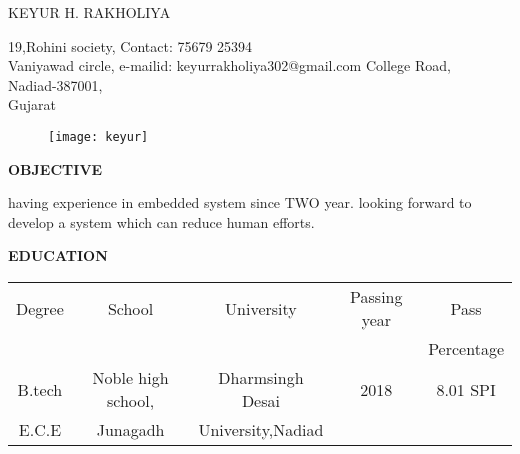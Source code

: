 \documentclass{article}
\begin{document}
 \begin{center}
 	 {
 	 	\large { KEYUR H. RAKHOLIYA}
 	 }
 	
 \end{center}
  \hline
 \begin{flushleft}
 	19,Rohini society, 		\hspace{2.8in}    		    Contact: 75679 25394            \\
 	Vaniyawad circle, 		\hspace{2.8in}		    	e-mailid: keyurrakholiya302@gmail.com
 	College Road, \\
	Nadiad-387001,     \\
 	Gujarat       \\
 \end{flushleft}
 \vspace{-0.3in}

 \begin{figure}[h]
    \hspace{4.4in}
	\texttt{[image: keyur]}
 \end{figure}
 
 \begin{flushleft}
 	\textbf{OBJECTIVE}
 	
 	\vspace{-0.20in}
 	\hspace{1.5in}
 	having experience in embedded system since TWO year. looking forward to develop a system which can reduce human efforts.
 \end{flushleft}
 
 \begin{flushleft}
 	\textbf{EDUCATION}
 	\hspace{0.45in}
 	\begin{tabular}{|c|c|c|c|c|}
 		\hline
 		Degree & School & University & Passing year & Pass   \\
 		&        &            &              & Percentage\\
 		\hline
 		
 		B.tech & Noble high school, & Dharmsingh Desai & 2018 &8.01 SPI\\
 	E.C.E	&Junagadh & University,Nadiad& & \\
 		\hline
 	\end{tabular}
 \end{flushleft}
 
\end{document}
